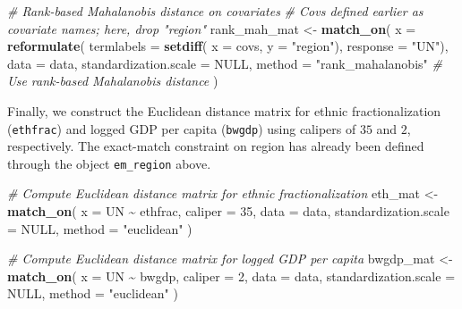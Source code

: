 \documentclass[
  12pt,
  leqno]{article}
\newenvironment{Shaded}{\begin{snugshade}}{\end{snugshade}}
\newcommand{\AttributeTok}[1]{\textcolor[rgb]{0.13,0.29,0.53}{#1}}
\newcommand{\CommentTok}[1]{\textcolor[rgb]{0.56,0.35,0.01}{\textit{#1}}}
\newcommand{\ConstantTok}[1]{\textcolor[rgb]{0.56,0.35,0.01}{#1}}
\newcommand{\DecValTok}[1]{\textcolor[rgb]{0.00,0.00,0.81}{#1}}
\newcommand{\FunctionTok}[1]{\textcolor[rgb]{0.13,0.29,0.53}{\textbf{#1}}}
\newcommand{\NormalTok}[1]{#1}
\newcommand{\OtherTok}[1]{\textcolor[rgb]{0.56,0.35,0.01}{#1}}
\newcommand{\SpecialCharTok}[1]{\textcolor[rgb]{0.81,0.36,0.00}{\textbf{#1}}}
\newcommand{\StringTok}[1]{\textcolor[rgb]{0.31,0.60,0.02}{#1}}
\begin{document}
\begin{Shaded}
\begin{Highlighting}[]
\CommentTok{\# Rank{-}based Mahalanobis distance on covariates}
\CommentTok{\# Covs defined earlier as covariate names; here, drop "region"}
\NormalTok{rank\_mah\_mat }\OtherTok{\textless{}{-}} \FunctionTok{match\_on}\NormalTok{(}
  \AttributeTok{x      =} \FunctionTok{reformulate}\NormalTok{(}
    \AttributeTok{termlabels =} \FunctionTok{setdiff}\NormalTok{(}
      \AttributeTok{x =}\NormalTok{ covs,}
      \AttributeTok{y =} \StringTok{"region"}\NormalTok{),}
    \AttributeTok{response   =} \StringTok{"UN"}\NormalTok{),}
  \AttributeTok{data   =}\NormalTok{ data,}
  \AttributeTok{standardization.scale =} \ConstantTok{NULL}\NormalTok{,}
  \AttributeTok{method =} \StringTok{"rank\_mahalanobis"} \CommentTok{\# Use rank{-}based Mahalanobis distance}
\NormalTok{)}
\end{Highlighting}
\end{Shaded}

\doublespacing

Finally, we construct the Euclidean distance matrix for ethnic
fractionalization (\texttt{ethfrac}) and logged GDP per capita
(\texttt{bwgdp}) using calipers of \(35\) and \(2\), respectively. The
exact-match constraint on region has already been defined through the
object \texttt{em\_region} above.

\singlespacing

\begin{Shaded}
\begin{Highlighting}[]
\CommentTok{\# Compute Euclidean distance matrix for ethnic fractionalization}
\NormalTok{eth\_mat }\OtherTok{\textless{}{-}} \FunctionTok{match\_on}\NormalTok{(}
  \AttributeTok{x =}\NormalTok{ UN }\SpecialCharTok{\textasciitilde{}}\NormalTok{ ethfrac,}
  \AttributeTok{caliper =} \DecValTok{35}\NormalTok{,}
  \AttributeTok{data =}\NormalTok{ data,}
  \AttributeTok{standardization.scale =} \ConstantTok{NULL}\NormalTok{,}
  \AttributeTok{method =} \StringTok{"euclidean"}
\NormalTok{)}

\CommentTok{\# Compute Euclidean distance matrix for logged GDP per capita}
\NormalTok{bwgdp\_mat }\OtherTok{\textless{}{-}} \FunctionTok{match\_on}\NormalTok{(}
  \AttributeTok{x =}\NormalTok{ UN }\SpecialCharTok{\textasciitilde{}}\NormalTok{ bwgdp,}
  \AttributeTok{caliper =} \DecValTok{2}\NormalTok{,}
  \AttributeTok{data =}\NormalTok{ data,}
  \AttributeTok{standardization.scale =} \ConstantTok{NULL}\NormalTok{,}
  \AttributeTok{method =} \StringTok{"euclidean"}
\NormalTok{)}
\end{Highlighting}
\end{Shaded}
\end{document}
